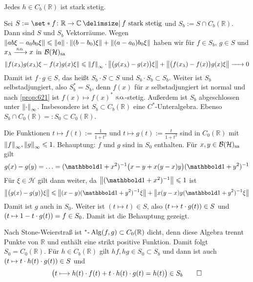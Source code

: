 \begin{proposition}[label=prop:623,{name=[jede beschränkte stetige Funktion ist stark stetig]}]
	Jedes $h \in C_b(\mathbb{R})$ ist stark stetig.
\end{proposition}
\begin{beweis}
	Sei $S := \set*{f \colon \mathbb{R}\to \mathbb{C} \given f \text{ stark stetig}}$ und $S_b := S \cap C_b(\mathbb{R})$.
	Dann sind $S$ und $S_b$ Vektorräume. 
	Wegen $\norm*{ab \xi - a_0 b_0 \xi} \le \norm*{a} \cdot \norm*{(b-b_0)\xi} + \norm*{(a-a_0)b_0\xi}$ haben wir für $f \in S_b$, $g \in S$ und $x_\lambda \grenzw{\so}x$ in $\mathcal{B}(\mathcal{H})_\sa$
	\[
		\norm*{f(x_\lambda) g(x_\lambda) \xi - f(x) g(x)\xi} \le \norm*{f}_\infty \cdot \norm*{\enbrace[\big]{g(x_\lambda)- g(x)}\xi} + \norm*{ \enbrace[\big]{f(x_\lambda)- f(x)} g(x) \xi}
		\grenzw{} 0
	\]
	Damit ist $f \cdot g \in S$, das heißt $S_b \cdot S \subset S$ und $S_b \cdot S_b \subset S_b$.
	Weiter ist $S_b$ selbstadjungiert, also $S_b^*=S_b$, denn  $f(x)$ für $x$ selbstadjungiert  ist normal und nach \autoref{prop:621} ist $f(x) \mapsto f(x)^*$ $\so$-stetig. 
	Außerdem ist $S_b$ abgeschlossen unter $\norm*{\cdot}_\infty$.
	Insbesondere ist $S_b \subset C_b(\mathbb{R})$ eine $C^*$-Unteralgebra.
	Ebenso $S_b \cap C_0(\mathbb{R}) =: S_0 \subset C_0(\mathbb{R})$.
	
	Die Funktionen $t \mapsto f(t):= \frac{1}{1+t^2}$ und $t \mapsto g(t) := \frac{t}{1+t^2}$ sind in $C_0(\mathbb{R})$ mit $\norm*{f}_\infty, \norm*{g}_\infty\le 1$.
	Behauptung: $f$ und $g$ sind in $S_0$ enthalten.
	Für $x,y \in \mathcal{B}(\mathcal{H})_\sa$ gilt 
	\[
		g(x)-g(y)= \ldots = (\ind+x^2)^{-1} \enbrace[\big]{x-y+x(y-x)y} (\ind+y^2)^{-1} 
	\]
	Für $\xi \in \mathcal{H}$ gilt dann weiter, da $\norm*{(\ind+x^2)^{-1}} \le 1$ ist
	\[
		\norm*{\enbrace[\big]{g(x)-g(y)}\xi} \le \norm*{(x-y)(\ind+y^2)^{-1} \xi} + \norm*{x(y-x) y(\ind+y^2)^{-1} \xi}
	\]
	Damit ist $g$ auch in $S_0$.
	Weiter ist $(t \mapsto t) \in S$, also $\enbrace*{t \mapsto t \cdot g(t)} \in S$ und $\enbrace*{t \mapsto 1-t \cdot g(t)}=f \in S_0$. 
	Damit ist die Behauptung gezeigt.
	
	Nach Stone-Weierstraß ist $^*\text{-}\Alg(f,g) \subset C_0(\mathbb{R})$ dicht, denn diese Algebra trennt Punkte von $\mathbb{R}$ und enthält eine strikt positive Funktion.
	Damit folgt $S_0=C_0(\mathbb{R})$.
	Für $h \in C_b(\mathbb{R})$ gilt $hf, hg \in S_0 \subset S_b$ und dann ist auch $\enbrace*{t \mapsto t \cdot h(t) \cdot g(t)} \in S$ und
	\[
		\enbrace[\big]{t \longmapsto h(t) \cdot f(t) + t \cdot h(t) \cdot g(t)=h(t)} \in S_b \qedhere
	\]
\end{beweis}

